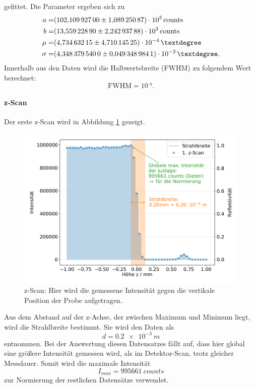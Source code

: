 gefittet.
Die Parameter ergeben sich zu
\begin{align*}
	a		= & \SI{102.109927 \pm 1.08925087 e+03}{counts} \\
	b		= & \SI{13.5592289 \pm 2.24293788 e+03}{counts} \\
	\mu 	= & \SI{4.73463215 \pm 4.71014525 e-04}{°} \\
	\sigma 	= & \SI{4.34837954 \pm 0.0493489841 e-02}{°}. \\
\end{align*}
Innerhalb aus den Daten wird die Halbwertsbreite (FWHM) zu folgendem Wert berechnet:
\begin{equation*}
	\text{FWHM} = \SI{10}{°}.
\end{equation*}


\FloatBarrier
\paragraph{z-Scan}
Der erste z-Scan wird in Abbildung \ref{fig:z} gezeigt.
\begin{figure}[h!]
  \centering
  \includegraphics[width=\textwidth]{content/images/done_plot_zscan.pdf}
  \caption{z-Scan: Hier wird die gemessene Intensität gegen die vertikale Position der Probe aufgetragen.}
  \label{fig:z}
\end{figure}
Aus dem Abstand auf der z-Achse, der zwischen Maximum und Minimum liegt, wird die Strahlbreite bestimmt.
Sie wird den Daten als
\begin{equation*}
	d = \SI{0.2e-3}{m}
\end{equation*}
entnommen.
Bei der Auswertung diesen Datensatzes fällt auf, dass hier global eine größere Intensität gemessen wird, als im Detektor-Scan, trotz gleicher Messdauer.
Somit wird die maximale Intensität
\begin{equation*}
	I_{max} = \SI{995661}{counts}
\end{equation*}
zur Normierung der restlichen Datensätze verwendet.

